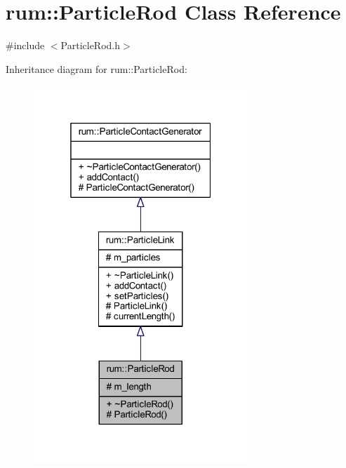 \hypertarget{classrum_1_1_particle_rod}{}\section{rum\+:\+:Particle\+Rod Class Reference}
\label{classrum_1_1_particle_rod}


{\ttfamily \#include $<$Particle\+Rod.\+h$>$}



Inheritance diagram for rum\+:\+:Particle\+Rod\+:\nopagebreak
\begin{figure}[H]
\begin{center}
\leavevmode
\includegraphics[width=229pt]{classrum_1_1_particle_rod__inherit__graph}
\end{center}
\end{figure}


